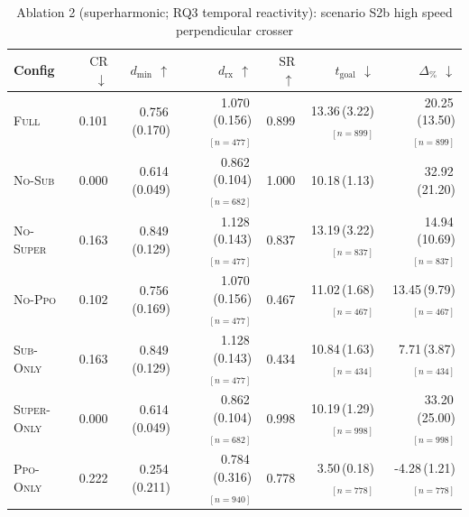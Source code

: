 \begin{table}[h]
\centering
\small
\caption{Ablation 2 (superharmonic; RQ3 temporal reactivity): scenario S2b high speed perpendicular crosser}
\label{tab:abl2:S2b_high_speed_perpendicular_crosser}
\begin{tabular}{lrrrrrr}
\toprule
Config & $\mathrm{CR}$ $\downarrow$ & $d_{\min}$ $\uparrow$ & $d_{\mathrm{rx}}$ $\uparrow$ & $\mathrm{SR}$ $\uparrow$ & $t_{\mathrm{goal}}$ $\downarrow$ & $\Delta_{\%}$ $\downarrow$ \\
\midrule
\textsc{Full} & 0.101 & 0.756\,(0.170) & 1.070\,(0.156)$_{[n=477]}$ & 0.899 & 13.36\,(3.22)$_{[n=899]}$ & 20.25\,(13.50)$_{[n=899]}$ \\
\textsc{No-Sub} & 0.000 & 0.614\,(0.049) & 0.862\,(0.104)$_{[n=682]}$ & 1.000 & 10.18\,(1.13) & 32.92\,(21.20) \\
\textsc{No-Super} & 0.163 & 0.849\,(0.129) & 1.128\,(0.143)$_{[n=477]}$ & 0.837 & 13.19\,(3.22)$_{[n=837]}$ & 14.94\,(10.69)$_{[n=837]}$ \\
\textsc{No-Ppo} & 0.102 & 0.756\,(0.169) & 1.070\,(0.156)$_{[n=477]}$ & 0.467 & 11.02\,(1.68)$_{[n=467]}$ & 13.45\,(9.79)$_{[n=467]}$ \\
\textsc{Sub-Only} & 0.163 & 0.849\,(0.129) & 1.128\,(0.143)$_{[n=477]}$ & 0.434 & 10.84\,(1.63)$_{[n=434]}$ & 7.71\,(3.87)$_{[n=434]}$ \\
\textsc{Super-Only} & 0.000 & 0.614\,(0.049) & 0.862\,(0.104)$_{[n=682]}$ & 0.998 & 10.19\,(1.29)$_{[n=998]}$ & 33.20\,(25.00)$_{[n=998]}$ \\
\textsc{Ppo-Only} & 0.222 & 0.254\,(0.211) & 0.784\,(0.316)$_{[n=940]}$ & 0.778 & 3.50\,(0.18)$_{[n=778]}$ & -4.28\,(1.21)$_{[n=778]}$ \\
\bottomrule
\end{tabular}
\end{table}

